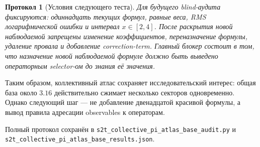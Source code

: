 \documentclass[12pt,a4paper]{article}
\newtheorem{protocol}{Протокол}
\begin{document}
\begin{protocol}[Условия следующего теста]
Для будущего blind-аудита фиксируются: одиннадцать текущих формул, равные веса,
RMS логарифмической ошибки и интервал $x\in[2,4]$. После раскрытия новой
наблюдаемой запрещены изменение коэффициентов, переназначение формулы,
удаление провала и добавление correction-term. Главный блокер состоит в том,
что назначение новой наблюдаемой формуле должно быть выведено операторным
selector-ом до знания её значения.
\end{protocol}

Таким образом, коллективный атлас сохраняет исследовательский интерес: общая
база около $3.16$ действительно сжимает несколько секторов одновременно.
Однако следующий шаг --- не добавление двенадцатой красивой формулы, а вывод
правила адресации observables к операторам.

Полный протокол сохранён в
\texttt{s2t\_collective\_pi\_atlas\_base\_audit.py} и
\texttt{s2t\_collective\_pi\_atlas\_base\_results.json}.
\end{document}
